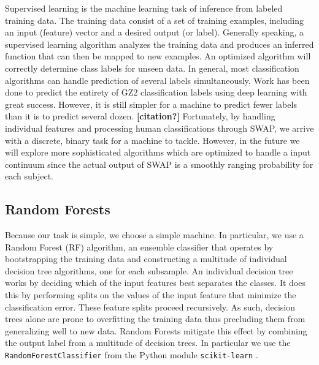 \documentclass[twocolumn]{aastex6}
\begin{document}
Supervised learning is the machine learning task of inference from labeled 
training data. The training data consist of a set of training examples, including
an input (feature) vector and a desired output (or label).  Generally speaking,
a supervised learning algorithm analyzes the training data and produces an inferred 
function that can then be mapped to new examples. An optimized algorithm will 
correctly determine class labels for unseen data. In general, most classification 
algorithms can handle prediction of several labels simultaneously. Work has been
done to predict the entirety of GZ2 classification labels using deep learning 
\citep{Dieleman2015} with great success. However, it is still simpler for a machine
to predict fewer labels than it is to predict several dozen. \textbf{[citation?]} 
Fortunately, by handling individual features and processing human classifications
through SWAP, we arrive with a discrete, binary task for a machine to tackle.
However, in the future we will explore more sophisticated algorithms which 
are optimized to handle a input continuum since the actual output of SWAP
is a smoothly ranging probability for each subject. 

\subsection{Random Forests}
Because our task is simple, we choose a simple machine. In particular, we use 
a Random Forest (RF) algorithm,  an ensemble classifier that operates by bootstrapping
the training data and constructing a multitude of individual decision tree algorithms, 
one for each subsample.  An individual decision tree works by deciding which of 
the input features best separates the classes. It does this by performing 
splits on the values of the input feature that minimize the classification 
error. These feature splits proceed recursively. As such, decision trees alone are
 prone to overfitting the training data thus precluding them from generalizing 
well to new data. Random Forests mitigate this effect by combining the 
output label from a multitude of decision trees.  In particular we use the 
\texttt{RandomForestClassifier} from the Python module \texttt{scikit-learn}
\citep{scikit-learn}. 
\end{document}
